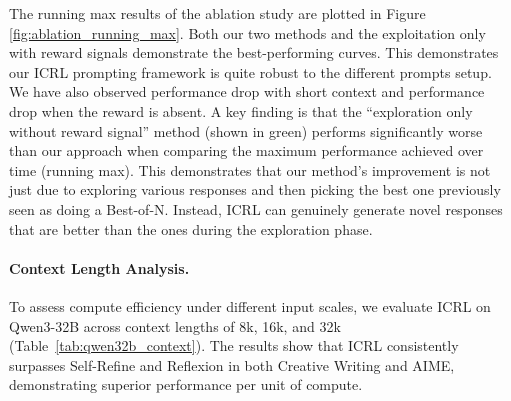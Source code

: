 \documentclass{article}
\newcommand{\0}{\mathbf{0}}
\begin{document}
The running max results of the ablation study are plotted in Figure \ref{fig:ablation_running_max}. Both our two methods and the exploitation only with reward signals demonstrate the best-performing curves. This demonstrates our ICRL prompting framework is quite robust to the different prompts setup. We have also observed performance drop with short context and performance drop when the reward is absent.
A key finding is that the ``exploration only without reward signal'' method (shown in green) performs significantly worse than our approach when comparing the maximum performance achieved over time (running max).
This demonstrates that our method's improvement is not just due to exploring various responses and then picking the best one previously seen as doing a Best-of-N. Instead, ICRL can genuinely generate novel responses that are better than the ones during the exploration phase.
\paragraph{Context Length Analysis.}
To assess compute efficiency under different input scales, we evaluate ICRL on Qwen3-32B \citep{yang2025qwen3technicalreport} across context lengths of 8k, 16k, and 32k (Table~\ref{tab:qwen32b_context}). The results show that ICRL consistently surpasses Self-Refine and Reflexion in both Creative Writing and AIME, demonstrating superior performance per unit of compute.
\end{document}
